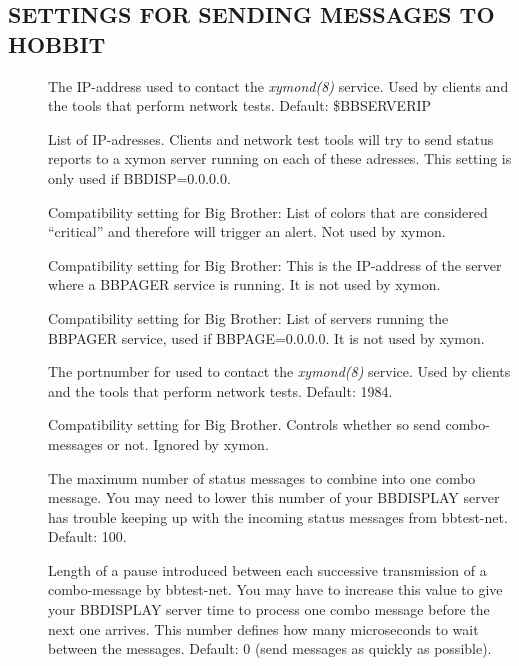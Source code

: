 \subsection{SETTINGS FOR SENDING MESSAGES TO HOBBIT}
\begin{description}
\item[] The IP-address used to contact the \emph{xymond(8)}
 service. Used by clients and the tools that perform network tests. Default: \$BBSERVERIP 

 

\item[] List of IP-adresses. Clients and network
  test tools will try to send status reports to a xymon server
  running on each of these adresses. This setting is only used if
  BBDISP=0.0.0.0. 


 

\item[] Compatibility setting for Big Brother: List
  of colors that are considered ``critical'' and therefore will
  trigger an alert. Not used by xymon. 


 

\item[] Compatibility setting for Big Brother: This is
  the IP-address of the server where a BBPAGER service is running. It
  is not used by xymon. 


 

\item[] Compatibility setting for Big Brother: List of
  servers running the BBPAGER service, used if BBPAGE=0.0.0.0. It is
  not used by xymon. 


 

\item[] The portnumber for used to contact the \emph{xymond(8)}
 service. Used by clients and the tools that perform network tests. Default: 1984. 

 

\item[] Compatibility setting for Big Brother. Controls
  whether so send combo-messages or not. Ignored by xymon. 


\item[] The maximum number of status messages
  to combine into one combo message. You may need to lower this number
  of your BBDISPLAY server has trouble keeping up with the incoming
  status messages from bbtest-net. Default: 100. 


\item[] Length of a pause introduced between
  each successive transmission of a combo-message by bbtest-net. You
  may have to increase this value to give your BBDISPLAY server time
  to process one combo message before the next one arrives. This
  number defines how many microseconds to wait between the
  messages. Default: 0 (send messages as quickly as possible). 


\end{description}
